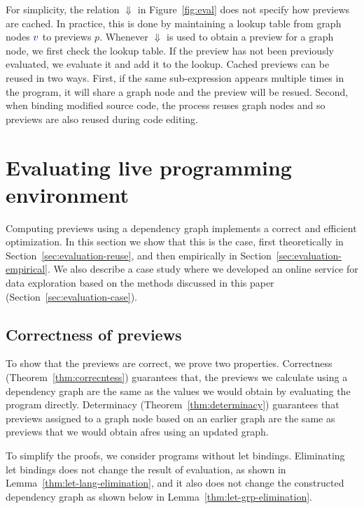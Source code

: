 \documentclass[english,crc]{programming}
\theoremstyle{plain}
\theoremstyle{definition}
\newcommand{\bndclr}[1]{\textcolor{kvdclr}{#1}}
\begin{document}
For simplicity, the relation $\Downarrow$ in Figure~\ref{fig:eval} does not specify how previews
are cached. In practice, this is done by maintaining a lookup table from graph nodes $\bndclr{v}$
to previews $p$. Whenever $\Downarrow$ is used to obtain a preview for a graph node, we first
check the lookup table. If the preview has not been previously evaluated, we evaluate it and add
it to the lookup. Cached previews can be reused in two ways. First, if the same sub-expression
appears multiple times in the program, it will share a graph node and the preview will be resued.
Second, when binding modified source code, the process reuses graph nodes and so previews are
also reused during code editing.


\section{Evaluating live programming environment}
\label{sec:evaluation}

Computing previews using a dependency graph implements a correct and efficient optimization.
In this section we show that this is the case, first theoretically in Section~\ref{sec:evaluation-reuse},
and then empirically in Section~\ref{sec:evaluation-empirical}. We also describe a case study where
we developed an online service for data exploration based on the methods discussed in this paper
(Section~\ref{sec:evaluation-case}).


\subsection{Correctness of previews}
\label{sec:evaluation-correctness}

To show that the previews are correct, we prove two properties. Correctness (Theorem~\ref{thm:correcntess})
guarantees that, the previews we calculate using a dependency graph are the same as the values we
would obtain by evaluating the program directly. Determinacy (Theorem~\ref{thm:determinacy})
guarantees that previews assigned to a graph node based on an earlier graph are the same as
previews that we would obtain afres using an updated graph.

To simplify the proofs, we consider programs without let bindings. Eliminating let bindings does
not change the result of evaluation, as shown in Lemma~\ref{thm:let-lang-elimination}, and it also
does not change the constructed dependency graph as shown below in Lemma~\ref{thm:let-grp-elimination}.
\end{document}
